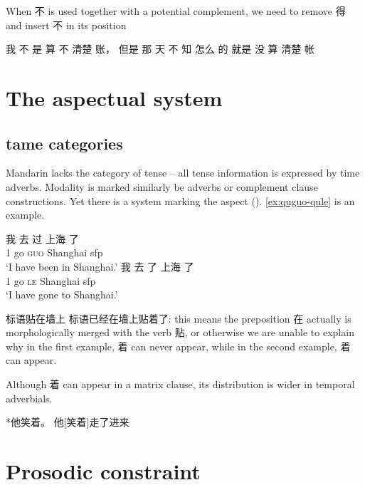 \documentclass[UTF8, a4paper, oneside, scheme=plain, 12pt]{ctexrep}
\newcommand{\asis}[1]{\textsc{#1}}
\newcommand{\translate}[1]{`#1'}
\begin{document}
When 不 is used together with a potential complement, 
we need to remove 得 and insert 不 in its position

\begin{exe}
    \ex 我 不 是 算 不 清楚 账， 但是 那 天 不 知 怎么 的 就是 没 算 清楚 帐
\end{exe}

\section{The aspectual system}\label{sec:aspectual}

\subsection{\acs{tame} categories}

Mandarin lacks the category of tense -- 
all tense information is expressed by time adverbs.
Modality is marked similarly be adverbs or complement clause constructions.
Yet there is a system marking the aspect (). 
\eqref{ex:quguo-qule} is an example.

\begin{exe}
    \ex \begin{xlist}
        \ex \gll 我 去 过 上海 了 \\
        1 go \asis{guo} Shanghai \acs{sfp} \\
        \glt \translate{I have been in Shanghai.}
        \ex \gll 我 去 了 上海 了 \\
        1 go \asis{le} Shanghai \acs{sfp} \\
        \glt \translate{I have gone to Shanghai.}
    \end{xlist}
    \label{ex:quguo-qule}
\end{exe}

标语贴在墙上 标语已经在墙上贴着了: 
this means the preposition 在 actually is morphologically merged with the verb 贴, 
or otherwise we are unable to explain why 
in the first example, 着 can never appear, 
while in the second example, 着 can appear.

Although 着 can appear in a matrix clause, 
its distribution is wider in temporal adverbials. 

*他笑着。
他[笑着]走了进来

\section{Prosodic constraint}\label{sec:vp.prosody}
\end{document}

